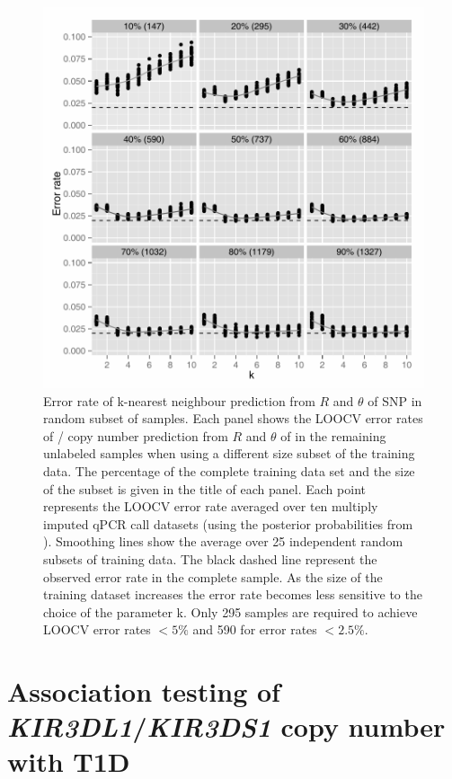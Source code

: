 \begin{figure}[h!]
  \centering
  \includegraphics[scale=.5]{KIR/figures/Figure-4.pdf}
  {Error rate of k-nearest neighbour prediction from $R$ and $\theta$ of SNP  in random subset of samples.}
  { Each panel shows the LOOCV error rates of / copy number prediction
  from $R$ and $\theta$ of  in the remaining unlabeled samples
  when using a different size subset of the training data.
  The percentage of the complete training data set and the size of the subset is given in the title of each panel.
  Each point represents the LOOCV error rate averaged over ten multiply imputed qPCR call datasets
  (using the posterior probabilities from ). 
  Smoothing lines show the average over 25 independent random subsets of training data.
  The black dashed line represent the observed error rate in the complete sample.
  As the size of the training dataset increases the error rate becomes less sensitive to the choice of the parameter k.
  Only 295 samples are required to achieve LOOCV error rates $<5\%$ and 590 for error rates $<2.5\%$. }
\end{figure}

\section{Association testing of \emph{KIR3DL1}/\emph{KIR3DS1} copy number with T1D}

